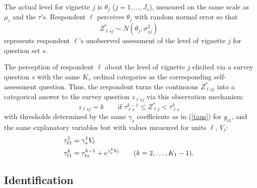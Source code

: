 \documentclass{amsart}
\begin{document}
The actual level for vignette $j$ is $\theta_j$ ($j=1,\dots,J_s$),
measured on the same scale as $\mu_i$ and the $\tau$'s.  Respondent
$\ell$ perceives $\theta_j$ with random normal error so that
\begin{equation}
  \label{stoch-v}
  Z_{{\ell}sj}^* \sim N(\theta_j,\sigma^2_{sj})
\end{equation}
represents respondent ${\ell}$'s unobserved assessment of the level of
vignette $j$ for question set $s$.

The perception of respondent ${\ell}$ about the level of vignette $j$
elicited via a survey question $s$ with the same $K_s$ ordinal
categories as the corresponding self-assessment question.  Thus, the
respondent turns the continuous $Z_{{\ell}sj}^*$ into a categorical
answer to the survey question $z_{{\ell}sj}$ via this observation
mechanism:
\begin{equation}
  \label{obsmech-v}
  z_{{\ell}sj} = k \qquad \text{if $\tau_{\ell s}^{k-1}\leq Z_{{\ell}j}^* 
    < \tau_{\ell s}^k$}
\end{equation}
with thresholds determined by the same $\gamma_s$ coefficients as in
(\ref{taus}) for $y_{i1}$, and the same explanatory variables but with
values measured for units $\ell$, $V_{\ell}$:
\begin{align}
  \label{taus-v}
  \tau_{{\ell}1}^1 &= \gamma_s^1 V_{\ell} \\ \notag \tau_{{\ell}1}^k
  &= \tau^{k-1}_{{\ell}s} +e^{\gamma_s^k V_{\ell}}\qquad
  (k=2,\dots,K_1-1).
\end{align}

\subsection{Identification}
\end{document}
